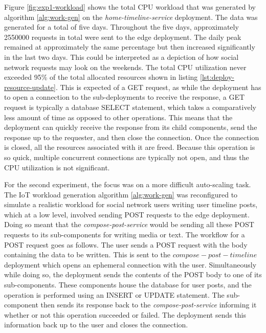 Figure \ref{fig:exp1-workload} shows the total CPU workload that was generated by algorithm \ref{alg:work-gen} on the \textit{home-timeline-service} deployment. The data was generated for a total of five days. Throughout the five days, approximately \num[group-separator={,}]{2550000} requests in total were sent to the edge deployment. The daily peak remained at approximately the same percentage but then increased significantly in the last two days. This could be interpreted as a depiction of how social network requests may look on the weekends. The total CPU utilization never exceeded 95\% of the total allocated resources shown in listing \ref{lst:deploy-resource-update}. This is expected of a GET request, as while the deployment has to open a connection to the sub-deployments to receive the response, a GET request is typically a database SELECT statement, which takes a comparatively less amount of time as opposed to other operations. This means that the deployment can quickly receive the response from its child components, send the response up to the requester, and then close the connection. Once the connection is closed, all the resources associated with it are freed. Because this operation is so quick, multiple concurrent connections are typically not open, and thus the CPU utilization is not significant.\par

For the second experiment, the focus was on a more difficult auto-scaling task. The IoT workload generation algorithm \ref{alg:work-gen} was reconfigured to simulate a realistic workload for social network users writing user timeline posts, which at a low level, involved sending POST requests to the edge deployment. Doing so meant that the \textit{compose-post-service} would be sending all these POST requests to its sub-components for writing media or text. The workflow for a POST request goes as follows. The user sends a POST request with the body containing the data to be written. This is sent to the $compose-post-timeline$ deployment which opens an ephemeral connection with the user. Simultaneously while doing so, the deployment sends the contents of the POST body to one of its sub-components. These components house the database for user posts, and the operation is performed using an INSERT or UPDATE statement. The sub-component then sends its response back to the \textit{compose-post-service} informing it whether or not this operation succeeded or failed. The deployment sends this information back up to the user and closes the connection.\par

